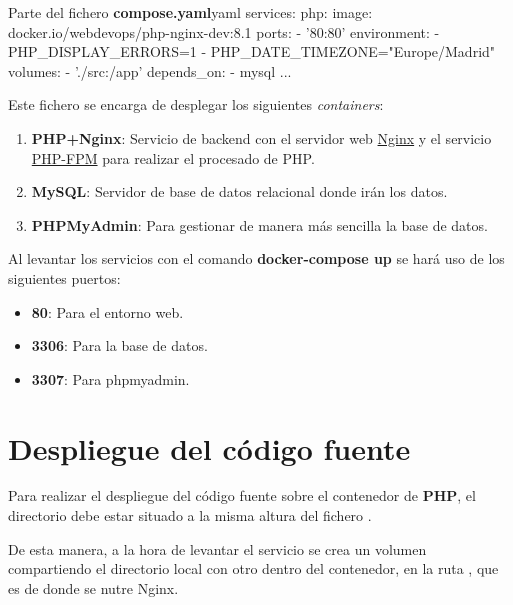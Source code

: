 \documentclass{\ClassPath/viu-tfm-template}
\begin{document}
\begin{mycode}{Parte del fichero \textbf{compose.yaml}}{yaml}{}
services:
    php:
        image: docker.io/webdevops/php-nginx-dev:8.1
        ports:
            - '80:80'
        environment:
            - PHP_DISPLAY_ERRORS=1
            - PHP_DATE_TIMEZONE="Europe/Madrid"
        volumes:
            - './src:/app'
        depends_on:
            - mysql
...
\end{mycode}

Este fichero se encarga de desplegar los siguientes \textit{containers}:
\vspace{-1em}
\begin{enumerate}
    \item \textbf{PHP+Nginx}: Servicio de backend con el servidor web
    \href{https://nginx.org/}{Nginx} y el servicio \href{https://php-fpm.org/}{PHP-FPM} para realizar el procesado de PHP.
    \item \textbf{MySQL}: Servidor de base de datos relacional donde irán los datos.
    \item \textbf{PHPMyAdmin}: Para gestionar de manera más sencilla la base de datos.
\end{enumerate}
\vspace{-1em}

Al levantar los servicios con el comando \textbf{docker-compose up} se hará uso de los siguientes puertos:
\vspace{-1em}
\begin{itemize}
    \item \textbf{80}: Para el entorno web.
    \item \textbf{3306}: Para la base de datos.
    \item \textbf{3307}: Para phpmyadmin.
\end{itemize}
\vspace{-1em}

\section{Despliegue del código fuente}
Para realizar el despliegue del código fuente sobre el contenedor de \textbf{PHP}, el directorio  debe estar situado a la misma altura del fichero .

De esta manera, a la hora de levantar el servicio se crea un volumen compartiendo el directorio local  con otro dentro del contenedor, en la ruta , que es de donde se nutre Nginx.
\end{document}
